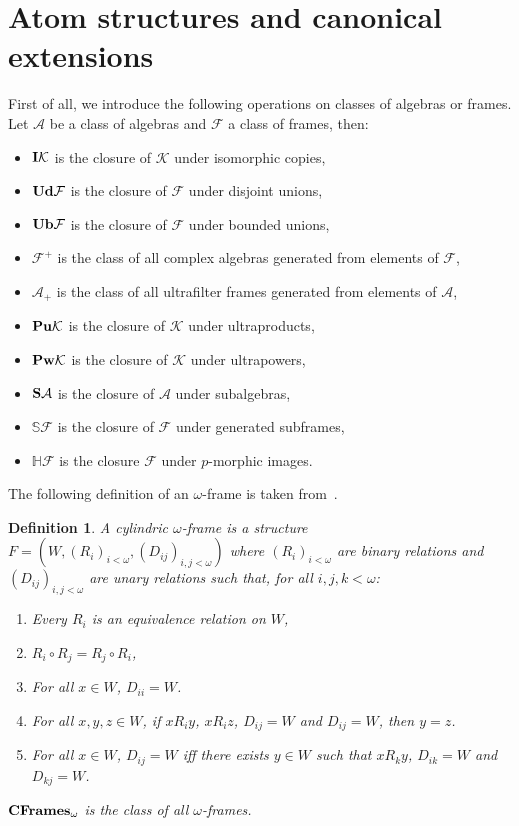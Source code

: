 \documentclass{article}
\theoremstyle{defin}
\newtheorem{definition}{Definition}
\theoremstyle{theorem}
\theoremstyle{claim}
\theoremstyle{prop}
\theoremstyle{lemma}
\theoremstyle{fact}
\theoremstyle{remark}
\theoremstyle{ex}
\theoremstyle{col}
\theoremstyle{question}
\begin{document}
\section{Atom structures and canonical extensions}

First of all, we introduce the following operations on classes of algebras or frames. 
Let $\mathcal{A}$ be a class of algebras and $\mathcal{F}$ a class of frames, then:
\begin{itemize}
\item ${\bf I} \mathcal{K}$ is the closure of $\mathcal{K}$ under isomorphic copies,
\item ${\bf Ud} \mathcal{F}$ is the closure of $\mathcal{F}$ under disjoint unions,
\item ${\bf Ub} \mathcal{F}$ is the closure of $\mathcal{F}$ under bounded unions,
\item $\mathcal{F}^+$ is the class of all complex algebras generated from elements of $\mathcal{F}$,
\item $\mathcal{A}_+$ is the class of all ultrafilter frames generated from elements of $\mathcal{A}$,
\item ${\bf Pu} \mathcal{K}$ is the closure of $\mathcal{K}$ under ultraproducts,
\item ${\bf Pw} \mathcal{K}$ is the closure of $\mathcal{K}$ under ultrapowers,
\item ${\bf S} \mathcal{A}$ is the closure of $\mathcal{A}$ under subalgebras,
\item $\mathbb{S} \mathcal{F}$ is the closure of $\mathcal{F}$ under generated subframes,
\item $\mathbb{H} \mathcal{F}$ is the closure $\mathcal{F}$ under $p$-morphic images.
\end{itemize}

The following definition of an $\omega$-frame is taken from~\cite{Venema2013}.
\begin{definition}
  A cylindric $\omega$-frame is a structure $F = (W, {(R_i)}_{i < \omega}, {(D_{ij})}_{i, j < \omega})$ 
  where ${(R_i)}_{i < \omega}$ are binary relations and ${(D_{ij})}_{i, j < \omega}$ 
  are unary relations such that, for all $i, j, k < \omega$:
  \begin{enumerate}
  \item Every $R_i$ is an equivalence relation on $W$,
  \item $R_i \circ R_j = R_j \circ R_i$,
  \item For all $x \in W$, $D_{ii} = W$.
  \item For all $x, y, z \in W$, if $x R_i y$, $x R_i z$, $D_{ij} = W$ and $D_{ij} = W$, then $y = z$.
  \item For all $x \in W$, $D_{ij} = W$ iff there exists $y \in W$ such that $x R_k y$, $D_{ik} = W$ and $D_{kj} = W$.
  \end{enumerate}
  ${\bf CFrames}_{\omega}$ is the class of all $\omega$-frames.
\end{definition}
\end{document}
